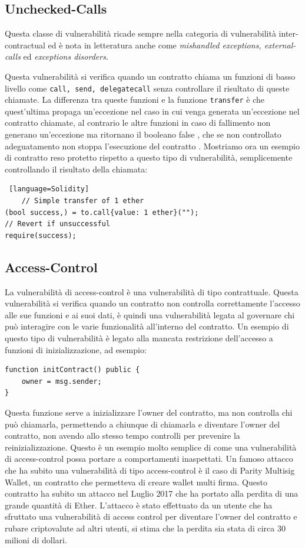 \documentclass[../../Thesis.tex]{subfiles}
\begin{document}
\subsection{Unchecked-Calls}
Questa classe di vulnerabilit\`a ricade sempre nella categoria di vulnerabilit\`a inter-contractual ed \`e nota in letteratura anche come \emph{mishandled exceptions, external-calls} ed \emph{exceptions disorders}. 

Questa vulnerabilit\`a si verifica quando un contratto chiama un funzioni di basso livello come \texttt{call, send, delegatecall} senza controllare il risultato di queste chiamate. La differenza tra queste funzioni e la funzione \texttt{transfer} \`e che quest'ultima propaga un'eccezione nel caso in cui venga generata un'eccezione nel contratto chiamate, al contrario le altre funzioni in caso di fallimento non generano un'eccezione ma ritornano il booleano false \cite{SurveySC}, che se non controllato adeguatamento non stoppa l'esecuzione del contratto \cite{careSC}.  Mostriamo ora un esempio di contratto reso protetto rispetto a questo tipo di vulnerabilit\`a, semplicemente controllando il risultato della chiamata:
\begin{lstlisting} [language=Solidity]
    // Simple transfer of 1 ether
(bool success,) = to.call{value: 1 ether}("");
// Revert if unsuccessful
require(success);
\end{lstlisting}


\subsection{Access-Control}
La vulnerabilit\`a di access-control \`e una vulnerabilit\`a di tipo contrattuale. Questa vulnerabilit\`a si verifica quando un contratto non controlla correttamente l'accesso alle sue funzioni e ai suoi dati, \`e quindi una vulnerabilit\`a legata al governare chi pu\`o interagire con le varie funzionalit\`a all'interno del contratto. Un esempio di questo tipo di vulnerabilit\`a \`e legato alla mancata restrizione dell'accesso a funzioni di inizializzazione, ad esempio:
\begin{lstlisting}[language=Solidity]
function initContract() public {
    owner = msg.sender;
}
\end{lstlisting} 
Questa funzione serve a inizializzare l'owner del contratto, ma non controlla chi pu\`o chiamarla, permettendo a chiunque di chiamarla e diventare l'owner del contratto, non avendo allo stesso tempo controlli per prevenire la reinizializzazione. Questo \`e un esempio molto semplice di come una vulnerabilit\`a di access-control possa portare a comportamenti inaspettati. 
Un famoso attacco che ha subito una vulnerabilit\`a di tipo access-control \`e il caso di Parity Multisig Wallet, un contratto che permetteva di creare wallet multi firma. Questo contratto ha subito un attacco nel Luglio 2017 che ha portato alla perdita di una grande quantit\`a di Ether. L'attacco \`e stato effettuato da un utente che ha sfruttato una vulnerabilit\`a di access control per diventare l'owner del contratto e rubare criptovalute ad altri utenti, si stima che la perdita sia stata di circa 30 milioni di dollari.
\end{document}
